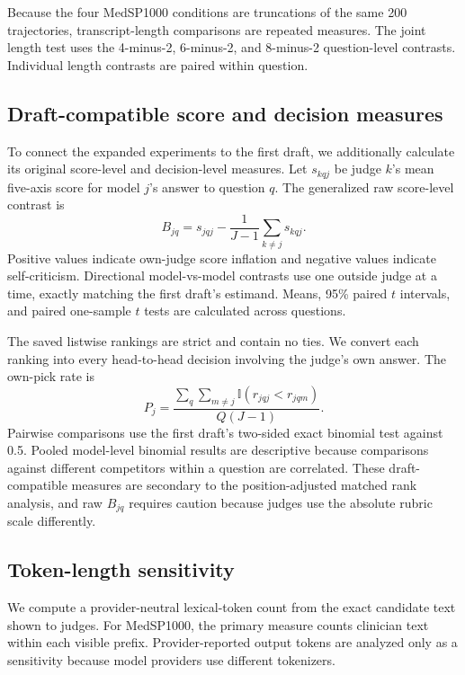 \documentclass[11pt]{article}
\begin{document}
Because the four MedSP1000 conditions are truncations of the same 200
trajectories, transcript-length comparisons are repeated measures. The joint
length test uses the 4-minus-2, 6-minus-2, and 8-minus-2 question-level
contrasts. Individual length contrasts are paired within question.

\subsection{Draft-compatible score and decision measures}

To connect the expanded experiments to the first draft, we additionally
calculate its original score-level and decision-level measures. Let $s_{kqj}$
be judge $k$'s mean five-axis score for model $j$'s answer to question $q$.
The generalized raw score-level contrast is
\begin{equation}
B_{jq}=s_{jqj}-\frac{1}{J-1}\sum_{k\ne j}s_{kqj}.
\end{equation}
Positive values indicate own-judge score inflation and negative values indicate
self-criticism. Directional model-vs-model contrasts use one outside judge at
a time, exactly matching the first draft's estimand. Means, 95\% paired
$t$ intervals, and paired one-sample $t$ tests are calculated across questions.

The saved listwise rankings are strict and contain no ties. We convert each
ranking into every head-to-head decision involving the judge's own answer. The
own-pick rate is
\begin{equation}
P_j=\frac{\sum_q\sum_{m\ne j}\mathbb{I}(r_{jqj}<r_{jqm})}{Q(J-1)}.
\end{equation}
Pairwise comparisons use the first draft's two-sided exact binomial test
against 0.5. Pooled model-level binomial results are descriptive because
comparisons against different competitors within a question are correlated.
These draft-compatible measures are secondary to the position-adjusted matched
rank analysis, and raw $B_{jq}$ requires caution because judges use the
absolute rubric scale differently.

\subsection{Token-length sensitivity}

We compute a provider-neutral lexical-token count from the exact candidate
text shown to judges. For MedSP1000, the primary measure counts clinician text
within each visible prefix. Provider-reported output tokens are analyzed only
as a sensitivity because model providers use different tokenizers.
\end{document}
